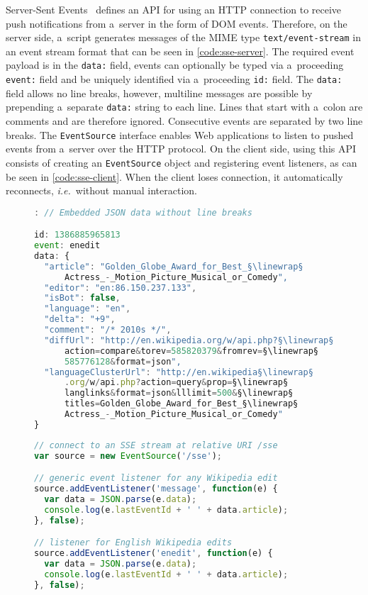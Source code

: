 \documentclass{sig-alternate}
\newcommand{\linewrap}{\raisebox{-.6ex}{\textcolor{grey}{$\hookleftarrow$}}}
\begin{document}
Server-Sent Events~\cite{hickson2012sse}
defines an API for using an HTTP connection
to receive push notifications from a~server
in the form of DOM events.
Therefore, on the server side, a~script generates messages
of the MIME type \texttt{text/event-stream}
in an event stream format that can be seen
in \autoref{code:sse-server}.
The required event payload is in the \texttt{data:} field,
events can optionally be typed via a~proceeding \texttt{event:} field
and be uniquely identified via a~proceeding \texttt{id:} field.
The \texttt{data:} field allows no line breaks,
however, multiline messages are possible by prepending
a~separate \texttt{data:} string to each line.
Lines that start with a~colon are comments and are therefore ignored.
Consecutive events are separated by two line breaks.
The \texttt{EventSource} interface enables Web applications
to listen to pushed events from a~server over the HTTP protocol.
On the client side, using this API consists of creating
an \texttt{EventSource} object and registering event listeners,
as can be seen in \autoref{code:sse-client}.
When the client loses connection,
it automatically reconnects,
\emph{i.e.}\ without manual interaction.

\begin{figure}[b!]
\begin{lstlisting}[caption={Server-Sent Event of type ``enedit''
  (formatted for legibility, \texttt{data:} allows no line breaks)},
  label=code:sse-server, language=JavaScript]
: // Embedded JSON data without line breaks

id: 1386885965813
event: enedit
data: {
  "article": "Golden_Globe_Award_for_Best_§\linewrap§
      Actress_-_Motion_Picture_Musical_or_Comedy",
  "editor": "en:86.150.237.133",
  "isBot": false,
  "language": "en",
  "delta": "+9",
  "comment": "/* 2010s */",
  "diffUrl": "http://en.wikipedia.org/w/api.php?§\linewrap§
      action=compare&torev=585820379&fromrev=§\linewrap§
      585776128&format=json",
  "languageClusterUrl": "http://en.wikipedia§\linewrap§
      .org/w/api.php?action=query&prop=§\linewrap§
      langlinks&format=json&lllimit=500&§\linewrap§
      titles=Golden_Globe_Award_for_Best_§\linewrap§
      Actress_-_Motion_Picture_Musical_or_Comedy"
}
\end{lstlisting}

\begin{lstlisting}[caption={Creation of an \texttt{EventSource}
  object and registration of two event listeners},
  label=code:sse-client, language=JavaScript]
// connect to an SSE stream at relative URI /sse
var source = new EventSource('/sse');

// generic event listener for any Wikipedia edit
source.addEventListener('message', function(e) {
  var data = JSON.parse(e.data);
  console.log(e.lastEventId + ' ' + data.article);
}, false);

// listener for English Wikipedia edits
source.addEventListener('enedit', function(e) {
  var data = JSON.parse(e.data);
  console.log(e.lastEventId + ' ' + data.article);
}, false);
\end{lstlisting}
\end{figure}
\end{document}
